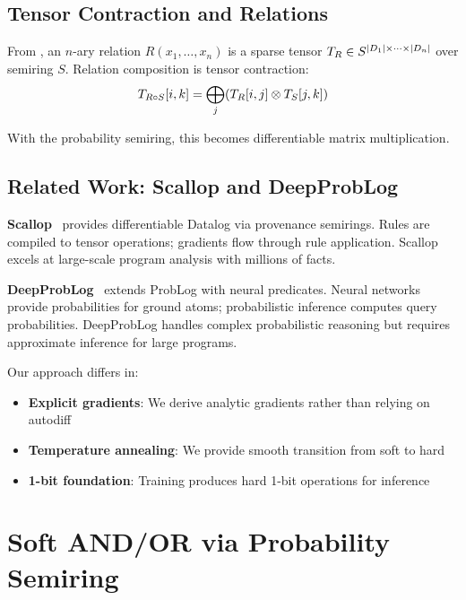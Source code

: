 \documentclass[11pt,a4paper]{article}
\begin{document}
\subsection{Tensor Contraction and Relations}
\label{subsec:tensor_contraction_chirho}

From \paperB{}, an $n$-ary relation $R(x_1, \ldots, x_n)$ is a sparse tensor $T_{R} \in S^{|D_1| \times \cdots \times |D_n|}$ over semiring $S$.
Relation composition is tensor contraction:
\[
T_{R \circ S}[i, k] = \bigoplus_j (T_{R}[i, j] \otimes T_{S}[j, k])
\]

With the probability semiring, this becomes differentiable matrix multiplication.

\subsection{Related Work: Scallop and DeepProbLog}
\label{subsec:related_chirho}

\textbf{Scallop}~\cite{scallop_chirho} provides differentiable Datalog via provenance semirings.
Rules are compiled to tensor operations; gradients flow through rule application.
Scallop excels at large-scale program analysis with millions of facts.

\textbf{DeepProbLog}~\cite{deepproblog_chirho} extends ProbLog with neural predicates.
Neural networks provide probabilities for ground atoms; probabilistic inference computes query probabilities.
DeepProbLog handles complex probabilistic reasoning but requires approximate inference for large programs.

Our approach differs in:
\begin{itemize}
  \item \textbf{Explicit gradients}: We derive analytic gradients rather than relying on autodiff
  \item \textbf{Temperature annealing}: We provide smooth transition from soft to hard
  \item \textbf{1-bit foundation}: Training produces hard 1-bit operations for inference
\end{itemize}

\section{Soft AND/OR via Probability Semiring}
\label{sec:soft_ops_chirho}
\end{document}
